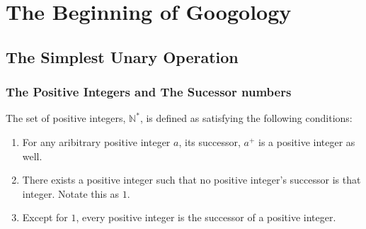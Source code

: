 \chapter{The Beginning of Googology} %

\section{The Simplest Unary Operation}

\subsection{The Positive Integers and The Sucessor numbers} %
The set of positive integers, $\mathbb{N}^*$, is defined as satisfying the following conditions:
\begin{enumerate}
	\item For any aribitrary positive integer $a$, its successor, $a^+$ is a positive integer as well.
	\item There exists a positive integer such that no positive integer's successor is that integer. Notate this as $1$.
	\item Except for $1$, every positive integer is the successor of a positive integer.
\end{enumerate}
